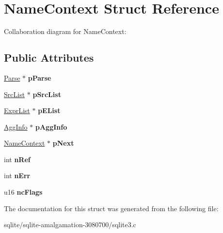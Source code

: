 \hypertarget{struct_name_context}{\section{Name\+Context Struct Reference}
\label{struct_name_context}
}


Collaboration diagram for Name\+Context\+:
\subsection*{Public Attributes}
\begin{DoxyCompactItemize}
\item 
\hypertarget{struct_name_context_a14635249bf75d5e18124089571dd2386}{\hyperlink{struct_parse}{Parse} $\ast$ {\bfseries p\+Parse}}\label{struct_name_context_a14635249bf75d5e18124089571dd2386}

\item 
\hypertarget{struct_name_context_a6ede21da33e2e9bd3d0c5fe90a3ec72c}{\hyperlink{struct_src_list}{Src\+List} $\ast$ {\bfseries p\+Src\+List}}\label{struct_name_context_a6ede21da33e2e9bd3d0c5fe90a3ec72c}

\item 
\hypertarget{struct_name_context_a8c752d7fb9b28179156c569cc57ba6f2}{\hyperlink{struct_expr_list}{Expr\+List} $\ast$ {\bfseries p\+E\+List}}\label{struct_name_context_a8c752d7fb9b28179156c569cc57ba6f2}

\item 
\hypertarget{struct_name_context_aeb3ff72c03dd770d421cadc2195a5644}{\hyperlink{struct_agg_info}{Agg\+Info} $\ast$ {\bfseries p\+Agg\+Info}}\label{struct_name_context_aeb3ff72c03dd770d421cadc2195a5644}

\item 
\hypertarget{struct_name_context_a82ce0ec8a3cc3d792e1f38bb5e0ad5fc}{\hyperlink{struct_name_context}{Name\+Context} $\ast$ {\bfseries p\+Next}}\label{struct_name_context_a82ce0ec8a3cc3d792e1f38bb5e0ad5fc}

\item 
\hypertarget{struct_name_context_ad68616ce2a58fa1b135e0dcf953bdc97}{int {\bfseries n\+Ref}}\label{struct_name_context_ad68616ce2a58fa1b135e0dcf953bdc97}

\item 
\hypertarget{struct_name_context_aba0b89b42e945c4c96d57a8fe011329c}{int {\bfseries n\+Err}}\label{struct_name_context_aba0b89b42e945c4c96d57a8fe011329c}

\item 
\hypertarget{struct_name_context_af1721ec037371cabc7385822cbd9629a}{u16 {\bfseries nc\+Flags}}\label{struct_name_context_af1721ec037371cabc7385822cbd9629a}

\end{DoxyCompactItemize}


The documentation for this struct was generated from the following file\+:\begin{DoxyCompactItemize}
\item 
sqlite/sqlite-\/amalgamation-\/3080700/sqlite3.\+c\end{DoxyCompactItemize}
